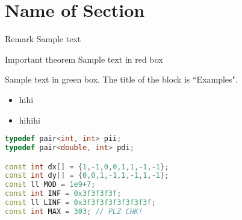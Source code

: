 \section{Name of Section}
\begin{frame}{\textbf{\currentname}}
    \begin{block}{Remark}
    Sample text
    \end{block}

    \begin{alertblock}{Important theorem}
    Sample text in red box
    \end{alertblock}

    \begin{examples}
    Sample text in green box. The title of the block is ``Examples".
    \end{examples}
    
    \begin{itemize}
        \item hihi
        \item hihihi
    \end{itemize}

\end{frame}

\begin{frame}[fragile]{\textbf{\currentname}}
    \begin{lstlisting}[language=C++]
typedef pair<int, int> pii;
typedef pair<double, int> pdi;

const int dx[] = {1,-1,0,0,1,1,-1,-1};
const int dy[] = {0,0,1,-1,1,-1,1,-1};
const ll MOD = 1e9+7;
const int INF = 0x3f3f3f3f;
const ll LINF = 0x3f3f3f3f3f3f3f3f;
const int MAX = 303; // PLZ CHK!
\end{lstlisting}
\end{frame}